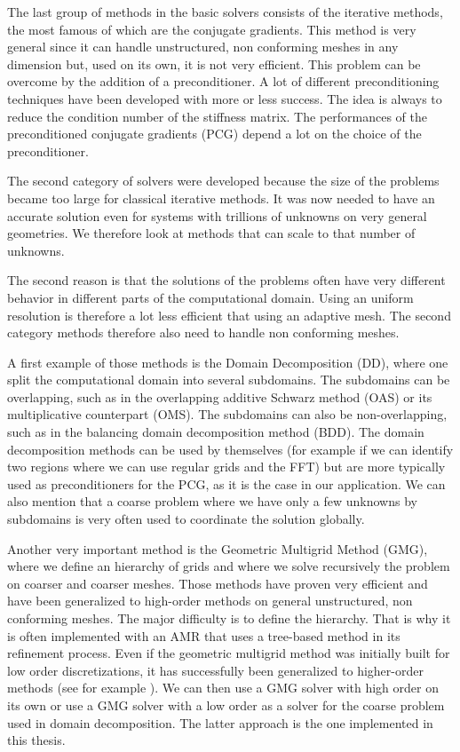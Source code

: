 The last group of methods in the basic solvers consists of the iterative methods, the most famous of which are the conjugate gradients. This method is very general since it can handle unstructured, non conforming meshes in any dimension but, used on its own, it is not very efficient. This problem can be overcome by the addition of a preconditioner. A lot of different preconditioning techniques have been developed with more or less success. The idea is always to reduce the condition number of the stiffness matrix. The performances of the preconditioned conjugate gradients (PCG) depend a lot on the choice of the preconditioner. 


The second category of solvers were developed because the size of the problems became too large for classical iterative methods. It was now needed to have an accurate solution even for systems with trillions of unknowns on very general geometries. We therefore look at methods that can scale to that number of unknowns.  

The second reason is that the solutions of the problems often have very different behavior in different parts of the computational domain. Using an uniform resolution is therefore a lot less efficient that using an adaptive mesh. The second category methods therefore also need to handle non conforming meshes. 

A first example of those methods is the Domain Decomposition (DD), where one split the computational domain into several subdomains. The subdomains can be overlapping, such as in the overlapping additive Schwarz method (OAS) or its multiplicative counterpart (OMS). The subdomains can also be non-overlapping, such as in the balancing domain decomposition method (BDD). The domain decomposition methods can be used by themselves (for example if we can identify two regions where we can use regular grids and the FFT) but are more typically used as preconditioners for the PCG, as it is the case in our application. We can also mention that a coarse problem where we have only a few unknowns by subdomains is very often used to coordinate the solution globally. 

Another very important method is the Geometric Multigrid Method (GMG), where we define an hierarchy of grids and where we solve recursively the problem on coarser and coarser meshes. Those methods have proven very efficient and have been generalized to high-order methods on general unstructured, non conforming meshes. The major difficulty is to define the hierarchy. That is why it is often implemented with an AMR that uses a tree-based method in its refinement process. Even if the geometric multigrid method was initially built for low order discretizations, it has successfully been generalized to higher-order methods (see for example \cite{multi_high}). We can then use a GMG solver with high order on its own or use a GMG solver with a low order as a solver for the coarse problem used in domain decomposition. The latter approach is the one implemented in this thesis. 

